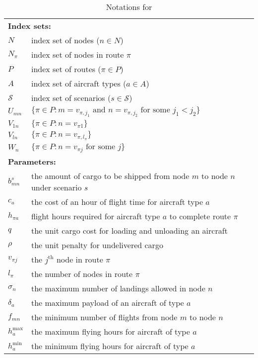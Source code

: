 \begin{table}[H]
	\caption{Notations for \cargo}
	\label{cargo:notation}
	\resizebox{\textwidth}{!}
	{
		\begin{tabular}{ll}
			\toprule
			\multicolumn{2}{l}{\textbf{Index sets:}} \\
			$N$ & index set of nodes ($n\in N$)\\ 
			$N_\pi $ & index set of nodes in route $\pi$\\
			$P$ & index set of routes ($\pi\in P$)\\ 
			$A$ & index set of aircraft types ($a\in A$)\\
			$\mathcal{S}$ & index set of scenarios ($s\in \mathcal{S}$) \\ 
			$U_{mn}$ & $\{\pi\in P:m=v_{\pi,j_1}\textrm{ and }n=v_{\pi,j_2}\textrm{ for some } j_1<j_2\}$ \\ 
			$V_{1n}$ & $\{\pi\in P:n=v_{\pi 1}\}$ \\ 
			$V_{ln}$ & $\{\pi\in P:n=v_{\pi,l_\pi}\} $\\
			$W_n$ & $\{\pi\in P:n=v_{\pi j}\textrm{ for some }j \}$\\
			\midrule
			\multicolumn{2}{l}{\textbf{Parameters:}} \\
			$b_{mn}^s$ & the amount of cargo to be shipped from node $m$ to node $n$ under scenario $s$\\
			$c_a$ & the cost of an hour of flight time for aircraft type $a$\\
			$h_{\pi a}$& flight hours required for aircraft type $a$ to complete route $\pi$\\ 
			$q$ & the unit cargo cost for loading and unloading an aircraft\\
			$\rho$ & the unit penalty for undelivered cargo \\
			$v_{\pi j}$ & the $j^{\textrm{th}}$ node in route $\pi$\\
			$l_\pi$ & the number of nodes in route $\pi$ \\
			$\sigma_n$ & the maximum number of landings allowed in node $n$ \\
			$\delta_a$ & the maximum payload of an aircraft of type $a$\\
			$f_{mn}$ & the minimum number of flights from node $m$ to node $n$\\
			$h_a^{\textrm{max}}$ & the maximum flying hours for aircraft of type $a$\\
			$h_a^{\textrm{min}}$ & the minimum flying hours for aircraft of type $a$\\

\end{tabular}}
\end{table}
